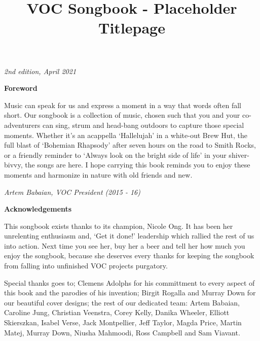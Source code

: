 \documentclass{article}
\begin{document}
\title{VOC Songbook - Placeholder Titlepage}
\begin{titlepage}
\maketitle
\thispagestyle{empty}
\end{titlepage}

\newpage

\noindent \textit{2nd edition, April 2021}

\vspace{4mm}

\textbf{Foreword}

\vspace{4mm}

Music can speak for us and express a moment in a way that words often
fall short. Our songbook is a collection of music, chosen such that you and
your co-adventurers can sing, strum and head-bang outdoors to capture those
special moments. Whether it's an acappella `Hallelujah' in a white-out Brew
Hut, the full blast of `Bohemian Rhapsody' after seven hours on the road to
Smith Rocks, or a friendly reminder to `Always look on the bright side of life'
in your shiver-bivvy, the songs are here. I hope carrying this book reminds
you to enjoy these moments and harmonize in nature with old friends and
new.

\vspace{4mm}
\textit{Artem Babaian, VOC President (2015 - 16)}

\vspace{10mm}

\textbf{Acknowledgements}

\vspace{4mm}

This songbook exists thanks to its champion, Nicole Ong. It has been her
unrelenting enthusiasm and, `Get it done!' leadership which rallied the rest of
us into action. Next time you see her, buy her a beer and tell her how much
you enjoy the songbook, because she deserves every thanks for keeping the
songbook from falling into unfinished VOC projects purgatory.
\vspace{4mm}

Special thanks goes to; Clemens Adolphs for his committment to every
aspect of this book and the parodies of his invention; Birgit Rogalla and
Murray Down for our beautiful cover designs; the rest of our dedicated team:
Artem Babaian, Caroline Jung, Christian Veenstra, Corey Kelly, Danika
Wheeler, Elliott Skierszkan, Isabel Verse, Jack Montpellier, Jeff Taylor,
Magda Price, Martin Matej, Murray Down, Niusha Mahmoodi, Ross
Campbell and Sam Viavant.
\end{document}
